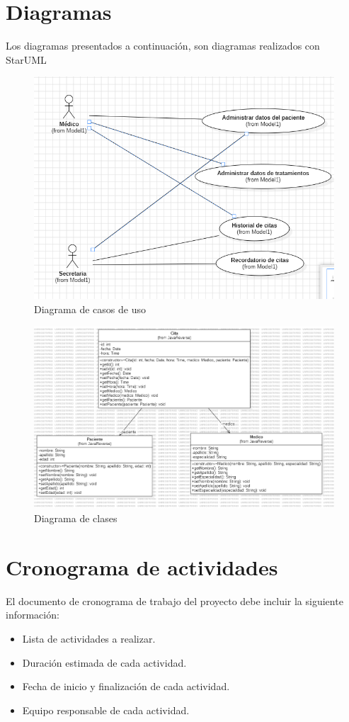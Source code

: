 \documentclass{article}
\theoremstyle{mytheoremstyle}
\theoremstyle{mytheoremstyle}
\theoremstyle{myproblemstyle}
\begin{document}
\section{Diagramas}
Los diagramas presentados a continuación, son diagramas realizados con StarUML
\begin{figure}[H]
	\centering
	\includegraphics[width=1\textwidth]{diagrama.png}
	\caption{Diagrama de casos de uso}
	\label{fig:imagen1}
\end{figure}

\begin{figure}[H]
	\centering
	\includegraphics[width=1\textwidth]{Diagrama de clase.png}
	\caption{Diagrama de clases}
	\label{fig:imagen2}
\end{figure}
\section{Cronograma de actividades}
El documento de cronograma de trabajo del proyecto debe incluir la siguiente información:
\begin{itemize}
	\item Lista de actividades a realizar.
	\item Duración estimada de cada actividad.
	\item  Fecha de inicio y finalización de cada actividad.
	\item Equipo responsable de cada actividad.
\end{itemize}
\end{document}
